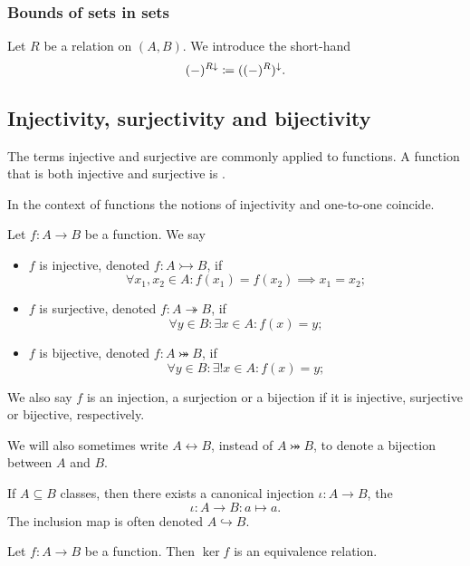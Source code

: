 \subsubsection{Bounds of sets in sets}
\begin{definition}
Let $R$ be a relation on $(A,B)$. We introduce the short-hand
\[ (-)^{R\downarrow} \coloneqq ((-)^R)^\downarrow. \]
\end{definition}

\subsection{Injectivity, surjectivity and bijectivity}
\begin{definition}
The terms injective and surjective are commonly applied to functions. A function that is both injective and surjective is .
\end{definition}
In the context of functions the notions of injectivity and one-to-one coincide.
\begin{lemma}
Let $f:A\to B$ be a function. We say
\begin{itemize}
\item $f$ is injective, denoted $f: A\rightarrowtail B$, if
\[ \forall x_1,x_2\in A: f(x_1) = f(x_2) \implies x_1 = x_2; \]
\item $f$ is surjective, denoted $f: A\twoheadrightarrow B$, if
\[ \forall y\in B: \exists x\in A: f(x) = y; \]
\item $f$ is bijective, denoted $f: A\twoheadrightarrowtail B$, if
\[ \forall y\in B: \exists! x\in A: f(x) = y; \]
\end{itemize}
We also say $f$ is an injection, a surjection or a bijection if it is injective, surjective or bijective, respectively.

We will also sometimes write $A \leftrightarrow B$, instead of $A\twoheadrightarrowtail B$, to denote a bijection between $A$ and $B$.
\end{lemma}

\begin{lemma}
If $A\subseteq B$ classes, then there exists a canonical injection $\iota: A\to B$, the 
\[ \iota: A\to B: a\mapsto a. \]
The inclusion map is often denoted $A\hookrightarrow B$.
\end{lemma}

\begin{lemma}
Let $f:A\to B$ be a function. Then $\ker f$ is an equivalence relation.
\end{lemma}

